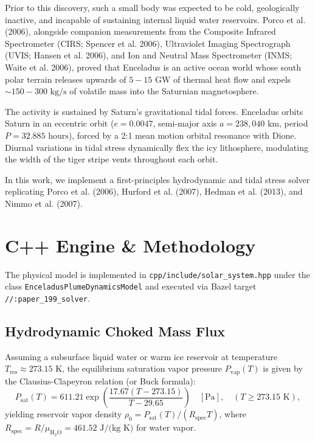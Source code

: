 \documentclass[11pt,a4paper]{article}
\begin{document}
Prior to this discovery, such a small body was expected to be cold, geologically inactive, and incapable of sustaining internal liquid water reservoirs. Porco et al. (2006), alongside companion measurements from the Composite Infrared Spectrometer (CIRS; Spencer et al. 2006), Ultraviolet Imaging Spectrograph (UVIS; Hansen et al. 2006), and Ion and Neutral Mass Spectrometer (INMS; Waite et al. 2006), proved that Enceladus is an active ocean world whose south polar terrain releases upwards of $5 - 15\text{ GW}$ of thermal heat flow and expels $\sim 150 - 300\text{ kg/s}$ of volatile mass into the Saturnian magnetosphere.

The activity is sustained by Saturn's gravitational tidal forces. Enceladus orbits Saturn in an eccentric orbit ($e = 0.0047$, semi-major axis $a = 238,040\text{ km}$, period $P = 32.885\text{ hours}$), forced by a 2:1 mean motion orbital resonance with Dione. Diurnal variations in tidal stress dynamically flex the icy lithosphere, modulating the width of the tiger stripe vents throughout each orbit.

In this work, we implement a first-principles hydrodynamic and tidal stress solver replicating Porco et al. (2006), Hurford et al. (2007), Hedman et al. (2013), and Nimmo et al. (2007).

\section{C++ Engine \& Methodology}
The physical model is implemented in \texttt{cpp/include/solar\_system.hpp} under the class \texttt{EnceladusPlumeDynamicsModel} and executed via Bazel target \texttt{//:paper\_199\_solver}.

\subsection{Hydrodynamic Choked Mass Flux}
Assuming a subsurface liquid water or warm ice reservoir at temperature $T_{\mathrm{res}} \approx 273.15\text{ K}$, the equilibrium saturation vapor pressure $P_{\mathrm{vap}}(T)$ is given by the Clausius-Clapeyron relation (or Buck formula):
\begin{equation}
P_{\mathrm{sat}}(T) = 611.21 \exp\left( \frac{17.67 (T - 273.15)}{T - 29.65} \right) \quad [\text{Pa}], \quad (T \ge 273.15\text{ K}),
\end{equation}
yielding reservoir vapor density $\rho_0 = P_{\mathrm{sat}}(T) / (R_{\mathrm{spec}} T)$, where $R_{\mathrm{spec}} = R / \mu_{\mathrm{H}_2\mathrm{O}} = 461.52\text{ J/(kg K)}$ for water vapor.
\end{document}
